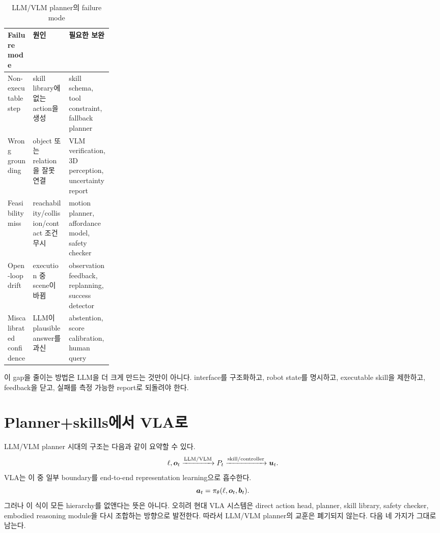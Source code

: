 \begin{table}[h]
  \centering
  \caption{LLM/VLM planner의 failure mode}
  \begin{tabularx}{\linewidth}{p{0.24\linewidth}X X}
    \toprule
    Failure mode & 원인 & 필요한 보완 \\
    \midrule
    Non-executable step & skill library에 없는 action을 생성 & skill schema, tool constraint, fallback planner \\
    Wrong grounding & object 또는 relation을 잘못 연결 & VLM verification, 3D perception, uncertainty report \\
    Feasibility miss & reachability/collision/contact 조건 무시 & motion planner, affordance model, safety checker \\
    Open-loop drift & execution 중 scene이 바뀜 & observation feedback, replanning, success detector \\
    Miscalibrated confidence & LLM이 plausible answer를 과신 & abstention, score calibration, human query \\
    \bottomrule
  \end{tabularx}
  \label{tab:llm-planner-failures}
\end{table}

이 gap을 줄이는 방법은 LLM을 더 크게 만드는 것만이 아니다. interface를 구조화하고, robot state를 명시하고, executable skill을 제한하고, feedback을 닫고, 실패를 측정 가능한 report로 되돌려야 한다.

\section{Planner+skills에서 VLA로}

LLM/VLM planner 시대의 구조는 다음과 같이 요약할 수 있다.
\begin{equation}
  \ell,\bm{o}_t
  \xrightarrow{\mathrm{LLM/VLM}}
  P_t
  \xrightarrow{\mathrm{skill/controller}}
  \bm{u}_t.
  \label{eq:planner-skills-pipeline}
\end{equation}
VLA는 이 중 일부 boundary를 end-to-end representation learning으로 흡수한다.
\begin{equation}
  \bm{a}_t
  =
  \pi_{\theta}(\ell,\bm{o}_t,\bm{b}_t).
  \label{eq:vla-direct-policy}
\end{equation}
그러나 이 식이 모든 hierarchy를 없앤다는 뜻은 아니다. 오히려 현대 VLA 시스템은 direct action head, planner, skill library, safety checker, embodied reasoning module을 다시 조합하는 방향으로 발전한다. 따라서 LLM/VLM planner의 교훈은 폐기되지 않는다. 다음 네 가지가 그대로 남는다.


